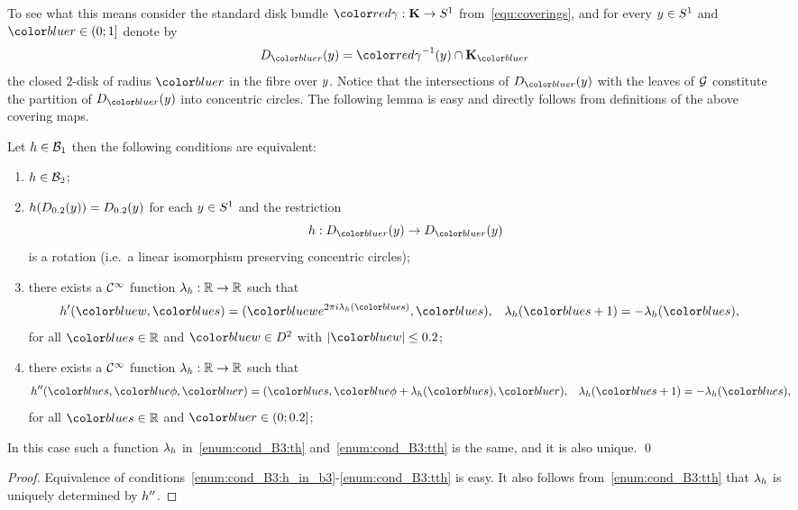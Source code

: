 \begin{enumerate}[wide, label={\rm\arabic*)}, topsep=1ex, itemsep=1ex]
To see what this means consider the standard disk bundle $\prFromKleinToCircle:\SKlein\to\Circle$ from~\eqref{equ:coverings}, and for every $y\in S^1$ and $\arad\in(0;1]$ denote by
\[
    \Diskyr{\py}{\arad} = \prFromKleinToCircle^{-1}(\py) \cap \RSkl{\arad}
\]
the closed $2$-disk of radius $\arad$ in the fibre over $y$.
Notice that the intersections of $\Diskyr{\py}{\arad}$ with the leaves of $\mathcal{G}$ constitute the partition of $\Diskyr{\py}{\arad}$ into concentric circles.
The following lemma is easy and directly follows from definitions of the above covering maps.
\begin{lemma}\label{lm:cond_B3}
Let $h\in\mathcal{B}_{ 1 }$ then the following conditions are equivalent:
\begin{enumerate}[topsep=1ex, itemsep=1ex, label={\rm(\arabic*)}, leftmargin=*]
\item\label{enum:cond_B3:h_in_b3}
$h\in\mathcal{B}_{ 2 }$;
\item\label{enum:cond_B3:h}
$h(D_{0.2}(y)) = D_{0.2}(y)$ for each $y\in S^1$ and the restriction 
\[ \dif:\Diskyr{\py}{\arad} \to \Diskyr{\py}{\arad}\]
is a rotation (i.e.\ a linear isomorphism preserving concentric circles);

\item\label{enum:cond_B3:th}
there exists a $\mathcal{C}^{\infty}$ function $\lambda_{h}:\mathbb{R}\to\mathbb{R}$ such that
\begin{align*}
&\tdif(\aw,\as) = (\aw e^{2\pi i \liftFunc{\dif}(\as)},\as),  &
&\liftFunc{\dif}(\as+1)=-\liftFunc{\dif}(\as),
\end{align*}
for all $\as\in\bR$ and $\aw\in D^2$ with $\nrm{\aw}\leq \aConst$;


\item\label{enum:cond_B3:tth}
there exists a $\mathcal{C}^{\infty}$ function $\lambda_{h}:\mathbb{R}\to\mathbb{R}$ such that
\begin{align*}
&\ttdif(\as,\aphi,\arad) = (\as, \aphi + \liftFunc{\dif}(\as),\arad),  &
&\liftFunc{\dif}(\as+1)=-\liftFunc{\dif}(\as),
\end{align*}
for all $\as\in\bR$ and $\arad\in(0;\aConst]$;
\end{enumerate}
In this case such a function $\lambda_{h}$ in~\ref{enum:cond_B3:th} and~\ref{enum:cond_B3:tth} is the same, and it is also unique.
\qed
\end{lemma}
\begin{proof}
Equivalence of conditions~\ref{enum:cond_B3:h_in_b3}-\ref{enum:cond_B3:tth} is easy.
It also follows from~\ref{enum:cond_B3:tth} that $\lambda_{h}$ is uniquely determined by $h''$.
\end{proof}


\end{enumerate}
